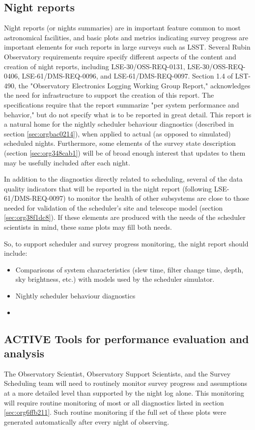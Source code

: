 \subsection{Night reports}
\label{sec:orgc6a3b21}
Night reports (or nights summaries) are in important feature common to most astronomical facilities, and basic plots and metrics indicating survey progress are important elements for such reports in large surveys such as LSST.
Several Rubin Observatory requirements require specify different aspects of the content and creation of night reports, including LSE-30/OSS-REQ-0131, LSE-30/OSS-REQ-0406, LSE-61/DMS-REQ-0096, and LSE-61/DMS-REQ-0097. Section 1.4 of LST-490, the "Observatory Electronics Logging Working Group Report," acknowledges the need for infrastructure to support the creation of this report.
The specifications require that the report summarize "per system performance and behavior," but do not specify what is to be reported in great detail.
This report is a natural home for the nightly scheduler behaviour diagnostics (described in section \ref{sec:orgbac0214}), when applied to actual (as opposed to simulated) scheduled nights.
Furthermore, some elements of the survey state description (section \ref{sec:org348cab1}) will be of broad enough interest that updates to them may be usefully included after each night.

In addition to the diagnostics directly related to scheduling, several of the data quality indicators that will be reported in the night report (following LSE-61/DMS-REQ-0097) to monitor the health of other subsystems are close to those needed for validation of the scheduler's site and telescope model (section \ref{sec:org38f1dc8}). If these elements are produced with the needs of the scheduler scientists in mind, these same plots may fill both needs.

So, to support scheduler and survey progress monitoring, the night report should include:
\begin{itemize}
\item Comparisons of system characteristics (slew time, filter change time, depth, sky brightness, etc.) with models used by the scheduler simulator.
\item Nightly scheduler behaviour diagnostics
\item 
\end{itemize}

\subsection{{\bfseries\sffamily ACTIVE} Tools for performance evaluation and analysis}
\label{sec:orgd3002ed}
The Observatory Scientist, Observatory Support Scientists, and the Survey Scheduling team will need to routinely monitor survey progress and assumptions at a more detailed level than supported by the night log alone.
This monitoring will require routine monitoring of most or all diagnostics listed in section \ref{sec:org6ffb211}. 
Such routine monitoring if the full set of these plots were generated automatically after every night of observing. 


